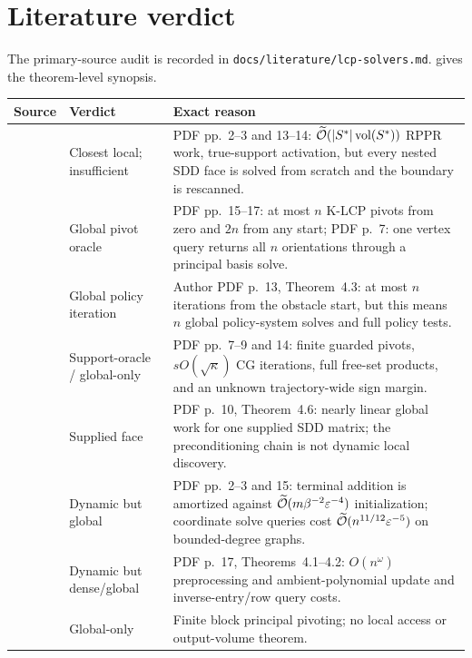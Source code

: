 \section{Literature verdict}
\label{sec:literature}

The primary-source audit is recorded in
\texttt{docs/literature/lcp-solvers.md}.   gives the
theorem-level synopsis.

\begin{table}[t]
\centering
\scriptsize
\begin{tabularx}{\textwidth}{@{}p{}p{}X@{}}
\toprule
Source & Verdict & Exact reason \\
\midrule
\citet{wei2026simple} & Closest local; insufficient & PDF pp.~2--3 and 13--14:
$\widetilde{\mathcal{O}}(|S^*|\operatorname{vol}(S^*))$ RPPR work, true-support activation, but every nested
SDD face is solved from scratch and the boundary is rescanned. \\
\citet{foniok2009pivoting} & Global pivot oracle & PDF pp.~15--17: at most $n$ K-LCP
pivots from zero and $2n$ from any start; PDF p.~7: one vertex query returns
all $n$ orientations through a principal basis solve. \\
\citet{bokanowski2009howard} & Global policy iteration & Author PDF p.~13,
Theorem~4.3: at most $n$ iterations from the obstacle start, but this means
$n$ global policy-system solves and full policy tests. \\
\citet{schmelzer2026nonnegative} & Support-oracle / global-only & PDF pp.~7--9 and 14:
finite guarded pivots, $sO(\sqrt\kappa)$ CG iterations, full free-set products,
and an unknown trajectory-wide sign margin. \\
\citet{koutis2011nearly} & Supplied face & PDF p.~10, Theorem~4.6: nearly
linear global work for one supplied SDD matrix; the preconditioning chain is
not dynamic local discovery. \\
\citet{durfee2019dynamic} & Dynamic but global & PDF pp.~2--3 and 15: terminal
addition is amortized against $\widetilde{\mathcal{O}}(m\beta^{-2}\varepsilon^{-4})$
initialization; coordinate solve queries cost
$\widetilde{\mathcal{O}}(n^{11/12}\varepsilon^{-5})$ on bounded-degree graphs. \\
\citet{brand2019inverse} & Dynamic but dense/global & PDF p.~17,
Theorems~4.1--4.2: $O(n^\omega)$ preprocessing and ambient-polynomial update
and inverse-entry/row query costs. \\
\citet{judice1994block} & Global-only & Finite block principal pivoting; no local
access or output-volume theorem. \\

\end{tabularx}
\end{table}
